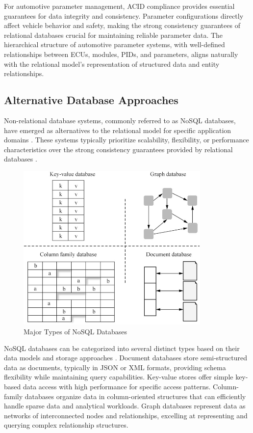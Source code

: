 For automotive parameter management, ACID compliance provides essential guarantees for data integrity and consistency. Parameter configurations directly affect vehicle behavior and safety, making the strong consistency guarantees of relational databases crucial for maintaining reliable parameter data. The hierarchical structure of automotive parameter systems, with well-defined relationships between \acp{ECU}, modules, \acp{PID}, and parameters, aligns naturally with the relational model's representation of structured data and entity relationships.

\subsection{Alternative Database Approaches}
\label{subsec:alternative-database-approaches}

Non-relational database systems, commonly referred to as \ac{NoSQL} databases, have emerged as alternatives to the relational model for specific application domains \cite{meier2019sql}. These systems typically prioritize scalability, flexibility, or performance characteristics over the strong consistency guarantees provided by relational databases \cite{brewer2000towards}.

\begin{figure}[ht]
    \centering
    \includegraphics[width=0.85\textwidth]{figures/nosql_types.png}
    \caption{Major Types of NoSQL Databases \cite{gaussdbdatabase}}
    \label{fig:nosql-types}
\end{figure}

NoSQL databases can be categorized into several distinct types based on their data models and storage approaches \cite{meier2019sql}. Document databases store semi-structured data as documents, typically in JSON or XML formats, providing schema flexibility while maintaining query capabilities. Key-value stores offer simple key-based data access with high performance for specific access patterns. Column-family databases organize data in column-oriented structures that can efficiently handle sparse data and analytical workloads. Graph databases represent data as networks of interconnected nodes and relationships, excelling at representing and querying complex relationship structures.

